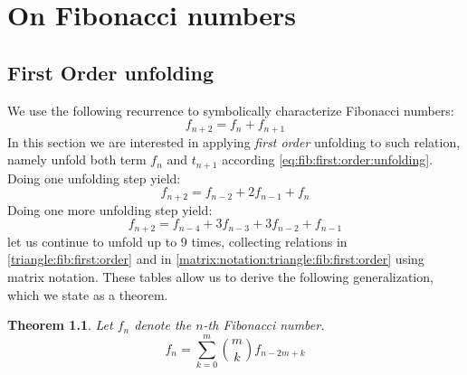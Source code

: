 \documentclass[a4paper,dottedtoc,headinclude,footinclude]{report} %
\theoremstyle{plain}
\newtheorem{thm}{Theorem}[section]
\begin{document}
    \chapter{On Fibonacci numbers}
    
    \section{First Order unfolding}
    
    We use the following recurrence to symbolically characterize Fibonacci numbers: 
    \begin{equation}
        \label{eq:fib:first:order:unfolding}
        f_{n + 2} = f_{n} + f_{n + 1}
    \end{equation}
    In this section we are interested in applying \emph{first order} unfolding
    to such relation, namely unfold both term $f_{n}$ and $t_{n+1}$ according
    \autoref{eq:fib:first:order:unfolding}. Doing one unfolding step yield:
    \begin{displaymath} 
        f_{n + 2} = f_{n - 2} + 2 f_{n - 1} + f_{n}
    \end{displaymath}
    Doing one more unfolding step yield:
    \begin{displaymath} 
        f_{n + 2} = f_{n - 4} + 3 f_{n - 3} + 3 f_{n - 2} + f_{n - 1}
    \end{displaymath}
    let us continue to unfold up to $9$ times, collecting relations in 
    \autoref{triangle:fib:first:order} and in \autoref{matrix:notation:triangle:fib:first:order}
    using matrix notation. These tables allow us to derive the 
    following generalization, which we state as a theorem.

    \begin{thm} Let $f_{n}$ denote the $n$-th Fibonacci number.
        \begin{displaymath} 
            f_{n} = \sum_{k=0}^{m} {{{m}\choose{k}} f_{n - 2 m + k}}
        \end{displaymath} 
    \end{thm}
\end{document}
